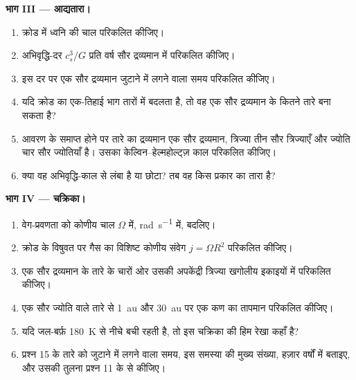 \begin{problem}
\noindent\textbf{भाग III --- आद्यतारा।}
\begin{enumerate}[resume]
  \item क्रोड में ध्वनि की चाल परिकलित कीजिए।
  \item अभिवृद्धि-दर $c_s^3/G$ प्रति वर्ष सौर द्रव्यमान में परिकलित कीजिए।
  \item इस दर पर एक सौर द्रव्यमान जुटाने में लगने वाला समय परिकलित कीजिए।
  \item यदि क्रोड का एक-तिहाई भाग तारों में बदलता है, तो वह एक सौर द्रव्यमान के
        कितने तारे बना सकता है?
  \item आवरण के समाप्त होने पर तारे का द्रव्यमान एक सौर द्रव्यमान, त्रिज्या तीन सौर
        त्रिज्याएँ और ज्योति चार सौर ज्योतियाँ है। उसका केल्विन--हेल्महोल्ट्ज़ काल परिकलित कीजिए।
  \item क्या वह अभिवृद्धि-काल से लंबा है या छोटा? तब वह किस प्रकार का
        तारा है?
\end{enumerate}

\noindent\textbf{भाग IV --- चक्रिका।}
\begin{enumerate}[resume]
  \item वेग-प्रवणता को कोणीय चाल $\Omega$ में,
        \unit{rad.s^{-1}} में, बदलिए।
  \item क्रोड के विषुवत पर गैस का विशिष्ट कोणीय संवेग $j = \Omega R^2$
        परिकलित कीजिए।
  \item एक सौर द्रव्यमान के तारे के चारों ओर उसकी अपकेंद्री त्रिज्या खगोलीय
        इकाइयों में परिकलित कीजिए।
  \item एक सौर ज्योति वाले तारे से \qty{1}{au} और \qty{30}{au} पर
        एक कण का तापमान परिकलित कीजिए।
  \item यदि जल-बर्फ़ \qty{180}{K} से नीचे बची रहती है, तो इस चक्रिका की
        हिम रेखा कहाँ है?
  \item प्रश्न 15 के तारे को जुटाने में लगने वाला समय, इस समस्या की मुख्य
        संख्या, हज़ार वर्षों में बताइए, और उसकी तुलना
        प्रश्न 11 के  से कीजिए।
\end{enumerate}
\end{problem}
